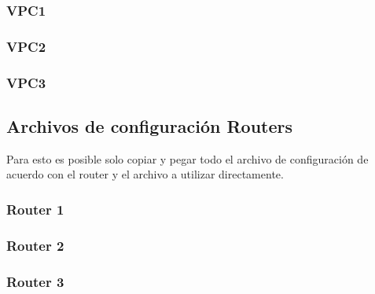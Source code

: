 \documentclass[10pt]{article}
\begin{document}
\subsubsection{VPC1}

\subsubsection{VPC2}

\subsubsection{VPC3}

\subsection{Archivos de configuración Routers}
Para esto es posible solo copiar y pegar todo el archivo de configuración de acuerdo con el router y el archivo a utilizar directamente.
\subsubsection{Router 1}

\clearpage
\subsubsection{Router 2}

\subsubsection{Router 3}

\end{document}
